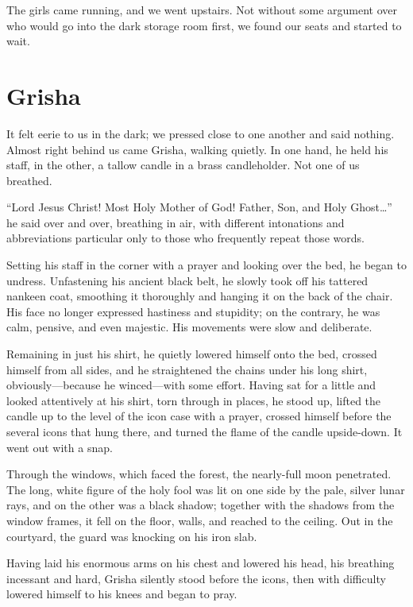 The girls came running, and we went upstairs. Not without some argument over who would go into the dark storage room first, we found our seats and started to wait.

\chapter{Grisha}

It felt eerie to us in the dark; we pressed close to one another and said nothing. Almost right behind us came Grisha, walking quietly. In one hand, he held his staff, in the other, a tallow candle in a brass candleholder. Not one of us breathed.

``Lord Jesus Christ! Most Holy Mother of God! Father, Son, and Holy Ghost\ldots{}'' he said over and over, breathing in air, with different intonations and abbreviations particular only to those who frequently repeat those words.

Setting his staff in the corner with a prayer and looking over the bed, he began to undress. Unfastening his ancient black belt, he slowly took off his tattered nankeen coat, smoothing it thoroughly and hanging it on the back of the chair. His face no longer expressed hastiness and stupidity; on the contrary, he was calm, pensive, and even majestic. His movements were slow and deliberate.

Remaining in just his shirt, he quietly lowered himself onto the bed, crossed himself from all sides, and he straightened the chains under his long shirt, obviously---because he winced---with some effort. Having sat for a little and looked attentively at his shirt, torn through in places, he stood up, lifted the candle up to the level of the icon case with a prayer, crossed himself before the several icons that hung there, and turned the flame of the candle upside-down. It went out with a snap.

Through the windows, which faced the forest, the nearly-full moon penetrated. The long, white figure of the holy fool was lit on one side by the pale, silver lunar rays, and on the other was a black shadow; together with the shadows from the window frames, it fell on the floor, walls, and reached to the ceiling. Out in the courtyard, the guard was knocking on his iron slab.

Having laid his enormous arms on his chest and lowered his head, his breathing incessant and hard, Grisha silently stood before the icons, then with difficulty lowered himself to his knees and began to pray.

